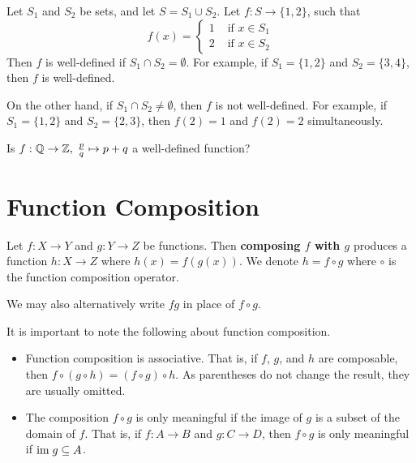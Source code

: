 \begin{example}
    Let $S_1$ and $S_2$ be sets, and let $S = S_1 \cup S_2$. Let $f: S \to \{1, 2\}$, such that
    \[
        f(x) = \begin{cases}
            1 & \textrm{ if } x \in S_1\\
            2 & \textrm{ if } x \in S_2
        \end{cases}
    \]
    Then $f$ is well-defined if $S_1 \cap S_2 = \emptyset$. For example, if $S_1 = \{1, 2\}$ and $S_2 = \{3, 4\}$, then $f$ is well-defined.

    On the other hand, if $S_1 \cap S_2 \neq \emptyset$, then $f$ is not well-defined. For example, if $S_1 = \{1, 2\}$ and $S_2 = \{2, 3\}$, then $f(2) = 1$ and $f(2) = 2$ simultaneously.
\end{example}

\begin{exercise}
    Is $f: \mathbb{Q} \to \mathbb{Z},\;\frac pq \mapsto p + q$ a well-defined function?
\end{exercise}

\section{Function Composition}
\begin{definition}
    Let $f: X \to Y$ and $g: Y \to Z$ be functions. Then \textbf{composing $f$ with $g$} produces a function $h: X \to Z$ where $h(x) = f(g(x))$. We denote $h = f \circ g$ where $\circ$ is the function composition operator.
\end{definition}
\begin{remark}
    We may also alternatively write $fg$ in place of $f \circ g$.
\end{remark}

It is important to note the following about function composition.
\begin{itemize}
    \item Function composition is associative. That is, if $f$, $g$, and $h$ are composable, then $f \circ (g \circ h) = (f \circ g) \circ h$. As parentheses do not change the result, they are usually omitted.
    \item The composition $f \circ g$ is only meaningful if the image of $g$ is a subset of the domain of $f$. That is, if $f: A \to B$ and $g: C \to D$, then $f \circ g$ is only meaningful if $\mathrm{im}\; g \subseteq A$.
\end{itemize}

